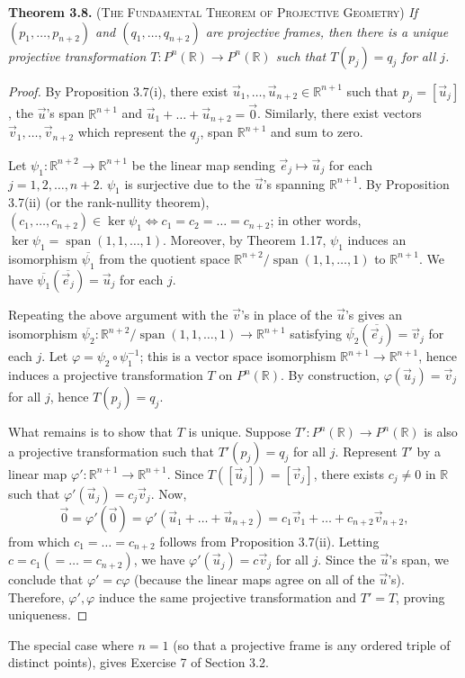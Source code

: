 \documentclass[leqno]{book}
\begin{document}
\noindent\textbf{Theorem 3.8.} \textsc{(The Fundamental Theorem of Projective Geometry)} \emph{If $(p_1,\dots,p_{n+2})$ and $(q_1,\dots,q_{n+2})$ are projective frames, then there is a unique projective transformation $T:P^n(\mathbb R)\to P^n(\mathbb R)$ such that $T(p_j)=q_j$ for all $j$.}
\begin{proof}
By Proposition 3.7(i), there exist $\vec u_1,\dots,\vec u_{n+2}\in\mathbb R^{n+1}$ such that $p_j=[\vec u_j]$, the $\vec u$'s span $\mathbb R^{n+1}$ and $\vec u_1+\dots+\vec u_{n+2}=\vec 0$.  Similarly, there exist vectors $\vec v_1,\dots,\vec v_{n+2}$ which represent the $q_j$, span $\mathbb R^{n+1}$ and sum to zero.

Let $\psi_1:\mathbb R^{n+2}\to\mathbb R^{n+1}$ be the linear map sending $\vec e_j\mapsto\vec u_j$ for each $j=1,2,\dots,n+2$.  $\psi_1$ is surjective due to the $\vec u$'s spanning $\mathbb R^{n+1}$.  By Proposition 3.7(ii) (or the rank-nullity theorem), $(c_1,\dots,c_{n+2})\in\ker\psi_1\iff c_1=c_2=\dots=c_{n+2}$; in other words, $\ker\psi_1=\operatorname{span}(1,1,\dots,1)$.  Moreover, by Theorem 1.17, $\psi_1$ induces an isomorphism $\overline{\psi_1}$ from the quotient space $\mathbb R^{n+2}/\operatorname{span}(1,1,\dots,1)$ to $\mathbb R^{n+1}$.  We have $\overline{\psi_1}(\overline{\vec e_j})=\vec u_j$ for each $j$.

Repeating the above argument with the $\vec v$'s in place of the $\vec u$'s gives an isomorphism $\overline{\psi_2}:\mathbb R^{n+2}/\operatorname{span}(1,1,\dots,1)\to\mathbb R^{n+1}$ satisfying $\overline{\psi_2}(\overline{\vec e_j})=\vec v_j$ for each $j$.  Let $\varphi=\psi_2\circ\psi_1^{-1}$; this is a vector space isomorphism $\mathbb R^{n+1}\to\mathbb R^{n+1}$, hence induces a projective transformation $T$ on $P^n(\mathbb R)$.  By construction, $\varphi(\vec u_j)=\vec v_j$ for all $j$, hence $T(p_j)=q_j$.

What remains is to show that $T$ is unique.  Suppose $T':P^n(\mathbb R)\to P^n(\mathbb R)$ is also a projective transformation such that $T'(p_j)=q_j$ for all $j$.  Represent $T'$ by a linear map $\varphi':\mathbb R^{n+1}\to\mathbb R^{n+1}$.  Since $T([\vec u_j])=[\vec v_j]$, there exists $c_j\ne 0$ in $\mathbb R$ such that $\varphi'(\vec u_j)=c_j\vec v_j$.  Now,
$$\vec 0=\varphi'(\vec 0)=\varphi'(\vec u_1+\dots+\vec u_{n+2})=c_1\vec v_1+\dots+c_{n+2}\vec v_{n+2},$$
from which $c_1=\dots=c_{n+2}$ follows from Proposition 3.7(ii).  Letting $c=c_1(=\dots=c_{n+2})$, we have $\varphi'(\vec u_j)=c\vec v_j$ for all $j$.  Since the $\vec u$'s span, we conclude that $\varphi'=c\varphi$ (because the linear maps agree on all of the $\vec u$'s).  Therefore, $\varphi',\varphi$ induce the same projective transformation and $T'=T$, proving uniqueness.
\end{proof}
\noindent The special case where $n=1$ (so that a projective frame is any ordered triple of distinct points), gives Exercise 7 of Section 3.2.
\end{document}
